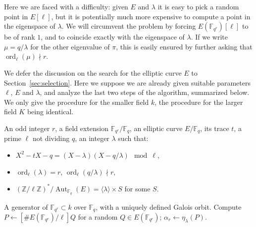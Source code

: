 \documentclass[12pt]{article}
\theoremstyle{plain}
\theoremstyle{definition}
\DeclareMathOperator{\order}{ord} %
\DeclareMathOperator{\Aut}{Aut}
\def\Z{\ensuremath{\mathbb{Z}}}
\def\F{\ensuremath{\mathbb{F}}}
\newcounter{algorithm}
\begin{document}
Here we are faced with a difficulty: given $E$ and $\lambda$ it is
easy to pick a random point in $E[\ell]$, but it is potentially much
more expensive to compute a point in the eigenspace of $\lambda$. We
will circumvent the problem by forcing $E(\F_{q^r})[\ell]$ to be of
rank $1$, and to coincide exactly with the eigenspace of $\lambda$.
If we write $\mu = q/\lambda$ for the other eigenvalue of $\pi$, this
is easily ensured by further asking that $\order_\ell(\mu) \nmid r$.

We defer the discussion on the search for the elliptic curve $E$ to
Section~\ref{sec:selection}. Here we suppose we are already given
suitable parameters $\ell$, $E$ and $\lambda$, and analyze the last
two steps of the algorithm, summarized below.  We only give the
procedure for the smaller field $k$, the procedure for the larger
field $K$ being identical.

\begin{algorithm}
\label{algorithm:compell}
  \begin{algorithmic}[1]
    \REQUIRE An odd integer $r$, a field extension $\F_{q^r}/\F_q$,
    an elliptic curve $E/\F_q$, its trace $t$, a prime $\ell$ not dividing $q$,
    an integer $\lambda$ such that:
    \begin{itemize}
    \item $X^2 - tX - q = (X-\lambda)(X-q/\lambda) \mod\ell$,
    \item $\order_\ell(\lambda)=r$, $\order_\ell(q/\lambda)\nmid r$,
    \item $(\Z/\ell\Z)^{\ast}/\Aut_{\F_q}(E) = \langle{\lambda}\rangle \times S$ for some $S$.
    \end{itemize}
    \ENSURE A generator of $\F_{q^r}\subset k$ over $\F_q$, with a uniquely defined Galois orbit.
    \REPEAT
    \STATE Compute $P\leftarrow[\# E(\F_{q^r})/\ell]Q$ for a random $Q\in E(\F_{q^r})$;
    \RETURN $\alpha_r\leftarrow\eta_\lambda(P)$.
  \end{algorithmic}
\end{algorithm}
\end{document}
